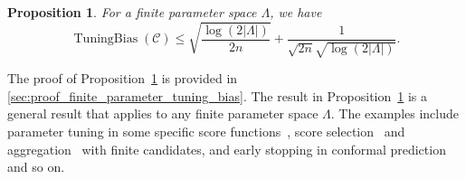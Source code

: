 \documentclass{article}
\newcommand{\1}{\mathbbm{1}}
\newcommand{\TuningBias}{\mathop{\text{TuningBias}}}
\theoremstyle{plain}
\newtheorem{proposition}[theorem]{Proposition}
\theoremstyle{definition}
\theoremstyle{remark}
\begin{document}
\begin{proposition}
    \label{prop:finite_parameter_tuning_bias}
    For a finite parameter space $\Lambda$, we have
    \begin{equation*}
        \TuningBias({\mathcal{C}}) \leq
        \sqrt{\frac{\log(2|\Lambda|)}{2n}} + \frac{1}{\sqrt{2n}\sqrt{\log(2|\Lambda|)}}.
    \end{equation*}
\end{proposition}
The proof of Proposition~\ref{prop:finite_parameter_tuning_bias} is provided in \cref{sec:proof_finite_parameter_tuning_bias}.
The result in Proposition~\ref{prop:finite_parameter_tuning_bias} is a general result that applies to any finite parameter space $\Lambda$. 
The examples include parameter tuning in some specific score functions~\citep{angelopoulos2021uncertainty,huang2024conformal}, score selection~\citep{yang2024selection} and aggregation~\citep{luo2024weighted} with finite candidates, and early stopping in conformal prediction~\citep{liang2023conformal} and so on.
\end{document}
